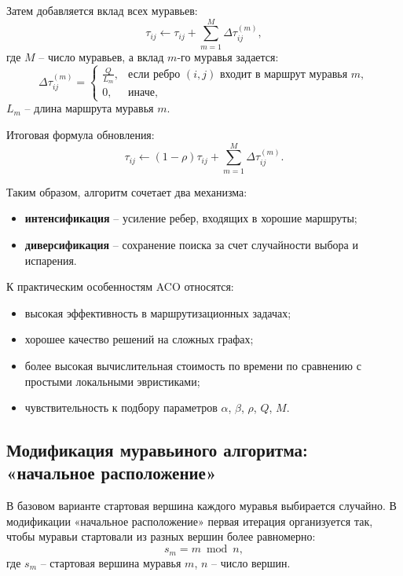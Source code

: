 \documentclass[12pt,a4paper]{article}
\begin{document}
Затем добавляется вклад всех муравьев:
\begin{equation}
\tau_{ij} \leftarrow \tau_{ij} + \sum_{m=1}^{M}\Delta\tau_{ij}^{(m)},
\end{equation}
где $M$ -- число муравьев, а вклад $m$-го муравья задается:
\begin{equation}
\Delta\tau_{ij}^{(m)}=
\begin{cases}
\frac{Q}{L_m}, & \text{если ребро }(i,j)\text{ входит в маршрут муравья }m,\\
0, & \text{иначе},
\end{cases}
\end{equation}
$L_m$ -- длина маршрута муравья $m$.

Итоговая формула обновления:
\begin{equation}
\tau_{ij} \leftarrow (1-\rho)\tau_{ij} + \sum_{m=1}^{M}\Delta\tau_{ij}^{(m)}.
\end{equation}

Таким образом, алгоритм сочетает два механизма:
\begin{itemize}
    \item \textbf{интенсификация} -- усиление ребер, входящих в хорошие маршруты;
    \item \textbf{диверсификация} -- сохранение поиска за счет случайности выбора и испарения.
\end{itemize}

К практическим особенностям ACO относятся:
\begin{itemize}
    \item высокая эффективность в маршрутизационных задачах;
    \item хорошее качество решений на сложных графах;
    \item более высокая вычислительная стоимость по времени по сравнению с простыми
    локальными эвристиками;
    \item чувствительность к подбору параметров $\alpha$, $\beta$, $\rho$, $Q$, $M$.
\end{itemize}

\subsection{Модификация муравьиного алгоритма: «начальное расположение»}

В базовом варианте стартовая вершина каждого муравья выбирается случайно.
В модификации «начальное расположение» первая итерация организуется так, чтобы
муравьи стартовали из разных вершин более равномерно:
\begin{equation}
s_m = m \bmod n,
\end{equation}
где $s_m$ -- стартовая вершина муравья $m$, $n$ -- число вершин.
\end{document}
